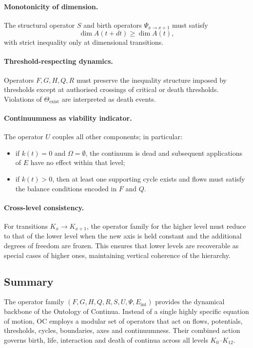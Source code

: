 \paragraph{Monotonicity of dimension.}
The structural operator \(S\) and birth operators \(\Psi_{x\to x+1}\) must
satisfy
\[
  \dim A(t+dt) \ge \dim A(t),
\]
with strict inequality only at dimensional transitions.

\paragraph{Threshold-respecting dynamics.}
Operators \(F, G, H, Q, R\) must preserve the inequality structure imposed by
thresholds except at authorised crossings of critical or death thresholds.
Violations of \(\Theta_{\mathrm{exist}}\) are interpreted as death events.

\paragraph{Continuumness as viability indicator.}
The operator \(U\) couples all other components; in particular:
\begin{itemize}
  \item if \(k(t) = 0\) and \(\Omega = \emptyset\), the continuum is dead and
        subsequent applications of \(E\) have no effect within that level;
  \item if \(k(t) > 0\), then at least one supporting cycle exists and flows
        must satisfy the balance conditions encoded in \(F\) and \(Q\).
\end{itemize}

\paragraph{Cross-level consistency.}
For transitions \(K_x \to K_{x+1}\), the operator family for the higher level
must reduce to that of the lower level when the new axis is held constant and
the additional degrees of freedom are frozen. This ensures that lower levels
are recoverable as special cases of higher ones, maintaining vertical
coherence of the hierarchy.

\subsection{Summary}

The operator family \((F, G, H, Q, R, S, U, \Psi, E_{\mathrm{int}})\) provides
the dynamical backbone of the Ontology of Continua. Instead of a single
highly specific equation of motion, OC employs a modular set of operators that
act on flows, potentials, thresholds, cycles, boundaries, axes and
continuumness. Their combined action governs birth, life, interaction and
death of continua across all levels \(K_0\)–\(K_{12}\).

